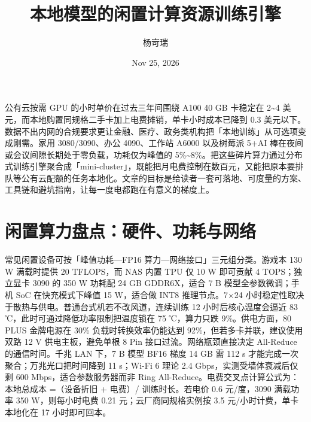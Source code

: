 \title{本地模型的闲置计算资源训练引擎}
\author{杨岢瑞}
\date{Nov 25, 2026}
\maketitle
公有云按需 GPU 的小时单价在过去三年间围绕 A100 40 GB 卡稳定在 2\~{}4 美元，而本地购置同规格二手卡加上电费摊销，单卡小时成本已降到 0.3 美元以下。数据不出内网的合规要求更让金融、医疗、政务类机构把「本地训练」从可选项变成刚需。家用 3080/3090、办公 4090、工作站 A6000 以及树莓派 5+AI 棒在夜间或会议间隙长期处于零负载，功耗仅为峰值的 5\%{}\~{}8\%{}。把这些碎片算力通过分布式训练引擎聚合成「mini-cluster」，既能把月电费控制在数百元，又能把原本要排队等公有云配额的任务本地化。文章的目标是给读者一套可落地、可度量的方案、工具链和避坑指南，让每一度电都跑在有意义的梯度上。\par
\chapter{闲置算力盘点：硬件、功耗与网络}
常见闲置设备可按「峰值功耗—FP16 算力—网络接口」三元组分类。游戏本 130 W 满载时提供 20 TFLOPS，而 NAS 内置 TPU 仅 10 W 即可贡献 4 TOPS；独立显卡 3090 的 350 W 功耗配 24 GB GDDR6X，适合 7 B 模型全参数微调；手机 SoC 在快充模式下峰值 15 W，适合做 INT8 推理节点。7×24 小时稳定性取决于散热与供电。普通台式机若不改风道，连续训练 12 小时后核心温度会逼近 83 ℃，此时可通过降低功率限制把温度锁在 75 ℃，算力只跌 9\%{}。供电方面，80 PLUS 金牌电源在 30\%{} 负载时转换效率仍能达到 92\%{}，但若多卡并联，建议使用双路 12 V 供电主板，避免单根 8 Pin 接口过流。网络瓶颈直接决定 All-Reduce 的通信时间。千兆 LAN 下，7 B 模型 BF16 梯度 14 GB 需 112 s 才能完成一次聚合；万兆光口把时间降到 11 s；Wi-Fi 6 理论 2.4 Gbps，实测受墙体衰减后仅剩 600 Mbps，适合参数服务器而非 Ring All-Reduce。电费交叉点计算公式为：本地总成本 =（设备折旧 + 电费）/ 训练时长。若电价 0.6 元/度，3090 满载功率 350 W，则每小时电费 0.21 元；云厂商同规格实例按 3.5 元/小时计费，单卡本地化在 17 小时即可回本。\par
